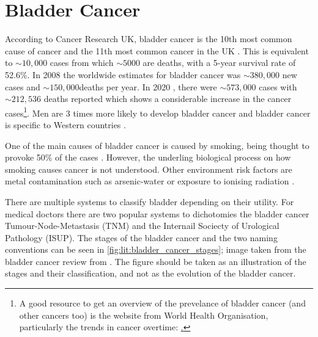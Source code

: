 \section{Bladder Cancer}


According to Cancer Research UK, bladder cancer is the 10th most common cause of cancer and the 11th most common cancer in the UK \cite{Cancer_Research_UK2015-cf}. This is equivalent to $\sim10,000$ cases from which  $\sim5000$ are deaths, with a 5-year survival rate of 52.6\%. In 2008\cite{Ferlay2010-sx} the worldwide estimates for bladder cancer was $\sim380,000$ new cases and $\sim150,000 $deaths per year. In 2020\cite{Sung2021-hn} , there were $\sim573,000$ cases with $\sim212,536$ deaths reported which shows a considerable increase in the cancer cases\footnote{A good resource to get an overview of the prevelance of bladder cancer (and other cancers too) is the website from World Health Organisation, particularly the trends in cancer overtime: \href{https://gco.iarc.fr/en}.}. Men are 3 times more likely to develop bladder cancer and bladder cancer is specific to Western countries \cite{Knowles2015-mu}. 

One of the main causes of bladder cancer is caused by smoking, being thought to provoke 50\% of the cases \citet{Knowles2015-mu}. However, the underling biological process on how smoking causes cancer is not understood. Other environment risk factors are metal contamination such as arsenic-water or exposure to ionising radiation \citet{Knowles2015-mu}. 

There are multiple systems to classify bladder depending on their utility. For medical doctors there are two popular systems to dichotomies the bladder cancer Tumour-Node-Metastasis (TNM) and the Internail Sociecty of Urological Pathology (ISUP). The stages of the bladder cancer and the two naming conventions can be seen in \cref{fig:lit:bladder_cancer_stages}; image taken from the bladder cancer review from \citet{Knowles2015-mu}. The figure should be taken as an illustration of the stages and their classification, and not as the evolution of the bladder cancer.

